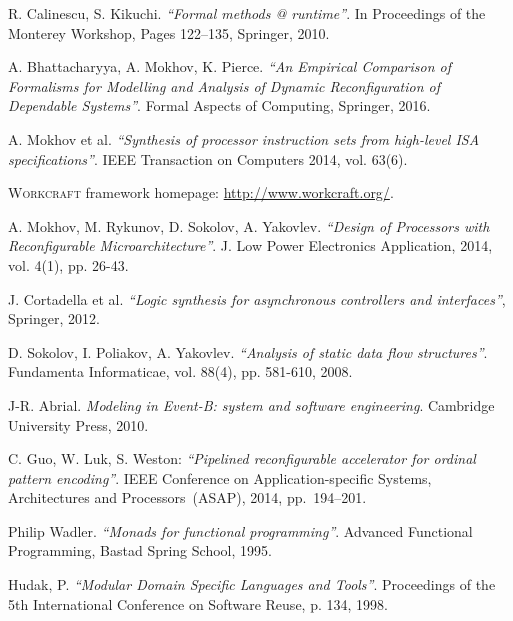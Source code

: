 \documentclass[conference]{IEEEtran}
\begin{document}
\begin{thebibliography}{12}

R. Calinescu, S. Kikuchi. \emph{``Formal methods @ runtime''}. In Proceedings of the Monterey Workshop, Pages 122–135, Springer, 2010.

A. Bhattacharyya, A. Mokhov, K. Pierce. \emph{``An Empirical Comparison of Formalisms for Modelling and Analysis of Dynamic Reconfiguration of Dependable Systems''}. Formal Aspects of Computing, Springer, 2016.

A. Mokhov et al.
\emph{``Synthesis of processor instruction sets from high-level ISA specifications''}. IEEE Transaction on Computers 2014, vol. 63(6).

    \textsc{Workcraft} framework homepage: \url{http://www.workcraft.org/}.

  A. Mokhov, M. Rykunov, D. Sokolov, A. Yakovlev.
  \emph{``Design of Processors with Reconfigurable Microarchitecture''}.
  J. Low Power Electronics Application, 2014, vol. 4(1), pp. 26-43.

J. Cortadella et al. \emph{``Logic synthesis for asynchronous controllers and interfaces''}, Springer, 2012.

  D. Sokolov, I. Poliakov, A. Yakovlev. \emph{``Analysis of static data flow structures''}. Fundamenta Informaticae, vol. 88(4), pp. 581-610, 2008.

  J-R. Abrial. \emph{Modeling in Event-B: system and software engineering}. Cambridge University Press, 2010.

  C. Guo, W. Luk, S. Weston:
  \emph{``Pipelined reconfigurable accelerator for ordinal pattern encoding''}.
  IEEE Conference on Application-specific Systems, Architectures and Processors~(ASAP), 2014,
  pp.~194--201.

  Philip Wadler.
  \emph{``Monads for functional programming''}.
  Advanced Functional Programming, Bastad Spring School, 1995.

  Hudak, P.
  \emph{``Modular Domain Specific Languages and Tools''}.
  Proceedings of the 5th International Conference on Software Reuse, p. 134, 1998.



\end{thebibliography}
\end{document}
